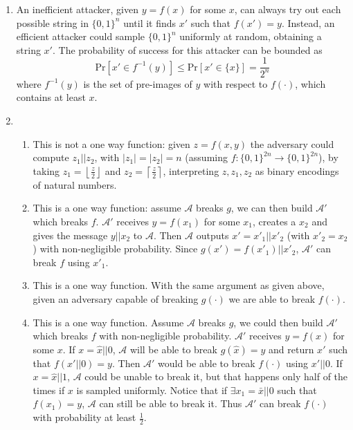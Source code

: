 \documentclass{article}
\newcommand{\adversary}{\mathcal{A}}
\renewcommand{\Pr}[1]{\ensuremath{\mathrm{Pr} \left[ {#1} \right]}}
\newcommand{\abs}[1]{\left| {#1} \right|}
\newcommand{\floor}[1]{\left\lfloor {#1} \right\rfloor}
\newcommand{\ceil}[1]{\left\lceil {#1} \right\rceil}
\begin{document}
\begin{enumerate}
	\item An inefficient attacker, given $y = f(x)$ for some $x$, can always try out each possible string in $\{0,1\}^{n}$ until it finds $x'$ such that $f(x')=y$.
		Instead, an efficient attacker could sample $\{0,1\}^{n}$ uniformly at random, obtaining a string $x'$.
		The probability of success for this attacker can be bounded as
		\[
			\Pr{x' \in f^{-1}(y)} \le \Pr{x' \in \{x\}} = \frac{1}{2^n}
		\]
		where $f^{-1}(y)$ is the set of pre-images of $y$ with respect to $f(\cdot)$, which contains at least $x$.

	\item
		\begin{enumerate}
			\item This is not a one way function: given $z = f(x,y)$ the adversary could compute $z_1 || z_2$, with $\abs{z_1} = \abs{z_2} = n$ (assuming $f : \{0,1\}^{2n} \to \{0,1\}^{2n}$), by taking $z_1 = \floor{\frac{z}{2}}$ and $z_2 = \ceil{\frac{z}{2}}$, interpreting $z, z_1, z_2$ as binary encodings of natural numbers.
			\item This is a one way function: assume $\adversary$ breaks $g$, we can then build $\adversary'$ which breaks $f$.
				$\adversary'$ receives $y = f(x_1)$ for some $x_1$, creates a $x_2$ and gives the message $y || x_2$ to $\adversary$.
				Then $\adversary$ outputs $x' = x'_1 || x'_2$ (with $x'_2 = x_2$) with non-negligible probability.
				Since $g(x') = f(x'_1) || x'_2$, $\adversary'$ can break $f$ using $x'_1$.
			\item This is a one way function.
				With the same argument as given above, given an adversary capable of breaking $g(\cdot)$ we are able to break $f(\cdot)$.
			\item This is a one way function.
				Assume $\adversary$ breaks $g$, we could then build $\adversary'$ which breaks $f$ with non-negligible probability.
				$\adversary'$ receives $y = f(x)$ for some $x$.
				If $x = \hat{x} || 0$, $\adversary$ will be able to break $g(\hat{x}) = y$ and return $x'$ such that $f(x' || 0) = y$.
				Then $\adversary'$ would be able to break $f(\cdot)$ using $x' || 0$.
				If $x = \hat{x} || 1$, $\adversary$ could be unable to break it, but that happens only half of the times if $x$ is sampled uniformly.
				Notice that if $\exists x_1 = \bar{x} || 0$ such that $f(x_1) = y$, $\adversary$ can still be able to break it.
				Thus $\adversary'$ can break $f(\cdot)$ with probability at least $\frac{1}{2}$.
		\end{enumerate}
\end{enumerate}
\end{document}
